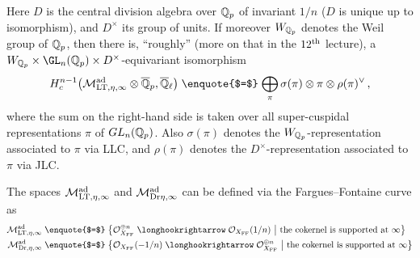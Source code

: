 \documentclass[a4paper, 10pt, oneside, DIV=9, chapterprefix=true, numbers=enddot,bibliography=totoc]{scrbook}
\begin{document}
Here $D$ is the central division algebra over $\mathbb{Q}_p$ of invariant $1/n$ ($D$ is unique up to isomorphism), and $D^\times$ its group of units. If moreover $W_{\mathbb{Q}_p}$ denotes the Weil group of $\mathbb{Q}_p$, then there is, \enquote{roughly} (more on that in the $12^{\text{th}}$ lecture), a $W_{\IQ_p}\times \GL_n(\IQ_p)\times D^\times$-equivariant isomorphism
\begin{equation*}
	H_c^{n-1}\big(\Mm_{\LT,\eta,\infty}^\ad\otimes {\ov{\IQ}_p},\ov{\IQ}_\ell\big)\mathrel{\text{\enquote{$=$}}}\bigoplus_\pi\sigma(\pi)\otimes \pi\otimes \rho(\pi)^\vee\,,
\end{equation*}
where the sum on the right-hand side is taken over all super-cuspidal representations $\pi$ of $GL_n(\mathbb{Q}_p)$. Also $\sigma(\pi)$ denotes the $W_{\mathbb{Q}_p}$-representation associated to $\pi$ via LLC, and $\rho(\pi)$ denotes the $D^\times$-representation associated to $\pi$ via JLC.

The spaces $\mathcal{M}_{\mathrm{LT},\eta,\infty}^{\mathrm{ad}}$ and $\mathcal{M}_{\mathrm{Dr}\eta,\infty}^{\mathrm{ad}}$ can be defined via the Fargues--Fontaine curve as
\begin{align*}
	\Mm_{\LT,\eta,\infty}^\ad &\mathrel{\text{\enquote{$=$}}} \left\{\Oo_{X_\FFC}^{\oplus n}\monomorphism \Oo_{X_\FFC}(1/n)\st \text{the cokernel is supported at }\infty\right\}\\
	\Mm_{\Dr,\eta,\infty}^\ad &\mathrel{\text{\enquote{$=$}}} \left\{\Oo_{X_\FFC}(-1/n)\monomorphism \Oo_{X_\FFC}^{\oplus n}\st \text{the cokernel is supported at }\infty\right\}
\end{align*}
\end{document}
